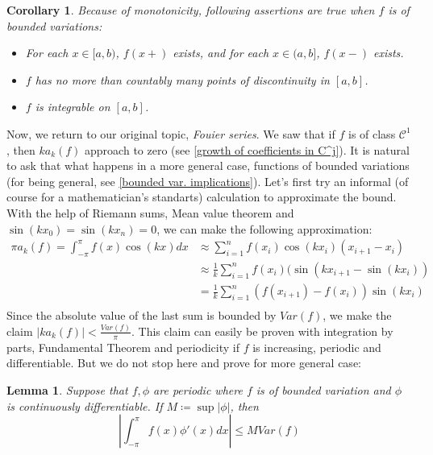 \documentclass[12pt]{amsart}
\newtheorem{corollary}[theorem]{Corollary}
\newtheorem{lemma}[theorem]{Lemma}
\theoremstyle{definition}
\newcommand{\cC}{{\mathcal C}}
\begin{document}
\begin{corollary}\label{facts on bounded var.}
    Because of monotonicity, following assertions are true when $f$ is of bounded variations:
    \begin{itemize}
        \item[(a)] For each \(x \in [a, b)\), \(f(x+)\) exists, and for each \(x \in (a, b]\), \(f(x-)\) exists.
        \item[(b)] $f$ has no more than countably many points of discontinuity in $[a,b]$.
        \item[(c)] $f$ is integrable on $[a,b]$.
    \end{itemize}
\end{corollary}


Now, we return to our original topic, \emph{Fouier series}. We saw that if $f$ is of class $\cC^1$, then $ka_k(f)$ approach to zero (see \ref{growth of coefficients in C^j}). It is natural to ask that what happens in a more general case, functions of bounded variations (for being general, see \ref{bounded var. implications}). Let's first try an informal (of course for a mathematician's standarts) calculation to approximate the bound. With the help of Riemann sums, Mean value theorem and $\sin(kx_0) = \sin(kx_n) = 0$, we can make the following approximation:
\[
\begin{aligned}
    \pi a_k(f) = \int_{-\pi}^{\pi}f(x) \cos(kx) dx &\approx \sum_{i = 1}^{n}f(x_i)\cos(kx_i)(x_{i+1} - x_i)\\
    &\approx \frac{1}{k} \sum_{i = 1}^{n}f(x_i)(\sin(kx_{i+1} - \sin(kx_i))\\
    &= \frac{1}{k} \sum_{i = 1}^{n}(f(x_{i+1}) - f(x_i)) \sin(kx_i)\\
\end{aligned}
\]
Since the absolute value of the last sum is bounded by $Var(f)$, we make the claim $|ka_k(f)| < \frac{Var(f)}{\pi}$. This claim can easily be proven with integration by parts, Fundamental Theorem and periodicity if $f$ is increasing, periodic and differentiable. But we do not stop here and prove for more general case:


\begin{lemma}\label{bounded var. coefficient grow}
    Suppose that $f,\phi$ are periodic where $f$ is of bounded variation and $\phi$ is continuously differentiable. If $M \coloneqq \sup{|\phi|}$, then
    \begin{equation}
        \left|\int_{-\pi}^{\pi}f(x)\phi'(x)dx\right| \leq M Var(f)
    \end{equation}
\end{lemma}
\end{document}
